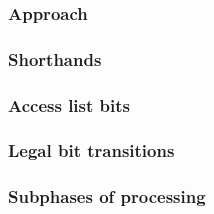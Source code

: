 \subsubsection{Approach                            } \label{rlp txn v2: phase constraints: access list: approach}              
\subsubsection{Shorthands                          } \label{rlp txn v2: phase constraints: access list: shorthands}            
\subsubsection{Access list bits                    } \label{rlp txn v2: phase constraints: access list: access list bits}      
\subsubsection{Legal bit transitions               } \label{rlp txn v2: phase constraints: access list: legal transitions}     
\subsubsection{Subphases of processing             } \label{rlp txn v2: phase constraints: access list: access list prefix}    
